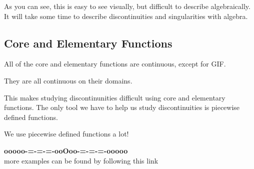 \documentclass{ximera}
\begin{document}
As you can see, this is easy to see visually, but difficult to describe algebraically.  It will take some time to describe discontinuities and singularities with algebra.




\subsection*{Core and Elementary Functions}


All of the core and elementary functions are continuous, except for GIF.


They are all continuous on their domains.

This makes studying discontinunities difficult using core and elementary functions.  The only tool we have to help us study discontinuities is piecewise defined functions.

We use piecewise defined functions a lot!






\begin{center}
\textbf{\textcolor{green!50!black}{ooooo-=-=-=-ooOoo-=-=-=-ooooo}} \\

more examples can be found by following this link\\ 

\end{center}
\end{document}
